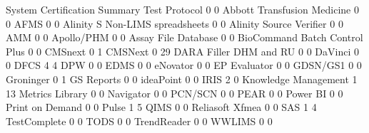 \documentclass{article}
\begin{document}
\begin{Schunk}
\begin{Soutput}
                                  System Certification Summary Test Protocol
                                                             0             0
  Abbott Transfusion Medicine                                0             0
  AFMS                                                       0             0
  Alinity S Non-LIMS spreadsheets                            0             0
  Alinity Source Verifier                                    0             0
  AMM                                                        0             0
  Apollo/PHM                                                 0             0
  Assay File Database                                        0             0
  BioCommand Batch Control Plus                              0             0
  CMSnext                                                    0             1
  CMSNext                                                    0            29
  DARA Filler DHM and RU                                     0             0
  DaVinci                                                    0             0
  DFCS                                                       4             4
  DPW                                                        0             0
  EDMS                                                       0             0
  eNovator                                                   0             0
  EP Evaluator                                               0             0
  GDSN/GS1                                                   0             0
  Groninger                                                  0             1
  GS Reports                                                 0             0
  ideaPoint                                                  0             0
  IRIS                                                       2             0
  Knowledge Management                                       1            13
  Metrics Library                                            0             0
  Navigator                                                  0             0
  PCN/SCN                                                    0             0
  PEAR                                                       0             0
  Power BI                                                   0             0
  Print on Demand                                            0             0
  Pulse                                                      1             5
  QIMS                                                       0             0
  Reliasoft Xfmea                                            0             0
  SAS                                                        1             4
  TestComplete                                               0             0
  TODS                                                       0             0
  TrendReader                                                0             0
  WWLIMS                                                     0             0
                                 

\end{Soutput}
\end{Schunk}
\end{document}
